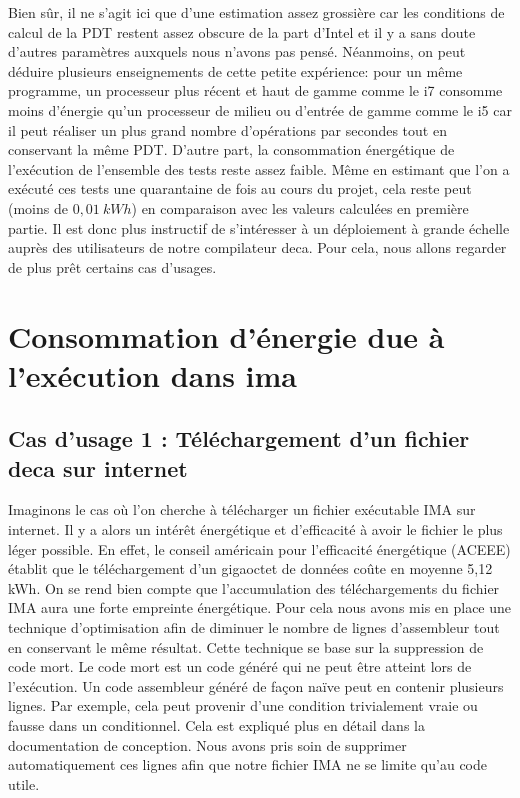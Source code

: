 \documentclass[12pt, a4paper, one side]{article}
\begin{document}
Bien sûr, il ne s'agit ici que d'une estimation assez grossière car les conditions de calcul de la PDT restent assez obscure de la part d'Intel et il y a sans doute d'autres paramètres auxquels nous n'avons pas pensé.
Néanmoins, on peut déduire plusieurs enseignements de cette petite expérience:
pour un même programme, un processeur plus récent et haut de gamme comme le i7 consomme moins d'énergie qu'un processeur de milieu ou d'entrée de gamme comme le i5  car il peut réaliser un plus grand nombre d'opérations par secondes tout en conservant la même PDT.
D'autre part, la consommation énergétique de l’exécution de l'ensemble des tests reste assez faible. Même en estimant que l'on a exécuté ces tests une quarantaine de fois au cours du projet, cela reste peut (moins de $0,01~kWh$) en comparaison avec les valeurs calculées en première partie. 
Il est donc plus instructif de s'intéresser à un déploiement à grande échelle auprès des utilisateurs de notre compilateur deca. Pour cela, nous allons regarder de plus prêt certains cas d'usages.



\section{Consommation d'énergie due à l'exécution dans ima}

\subsection{Cas d'usage 1 : Téléchargement d'un fichier deca sur internet}

Imaginons le cas où l'on cherche à télécharger un fichier exécutable IMA sur internet. Il y a alors un intérêt énergétique et d'efficacité à avoir le fichier le plus léger possible. En effet, le conseil américain pour l’efficacité énergétique (ACEEE) établit que le téléchargement d'un gigaoctet de données coûte en moyenne 5,12 kWh. On se rend bien compte que l'accumulation des téléchargements du fichier IMA aura une forte empreinte énergétique. Pour cela nous avons mis en place une technique d'optimisation afin de diminuer le nombre de lignes d'assembleur tout en conservant le même résultat. Cette technique se base sur la suppression de code mort. Le code mort est un code généré qui ne peut être atteint lors de l'exécution. Un code assembleur généré de façon naïve peut en contenir plusieurs lignes. Par exemple, cela peut provenir d'une condition trivialement vraie ou fausse dans un conditionnel. Cela est expliqué plus en détail dans la documentation de conception.
Nous avons pris soin de supprimer automatiquement ces lignes afin que notre fichier IMA ne se limite qu'au code utile. 
\end{document}
